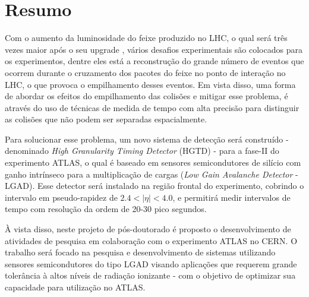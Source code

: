 \chapter*{Resumo}


Com o aumento da luminosidade do feixe produzido no LHC, o qual será três vezes maior após o seu upgrade \cite{HL_LHC,tdr}, vários desafios experimentais são colocados para os experimentos, dentre eles está a reconstrução do grande número de eventos que ocorrem durante o cruzamento dos pacotes do feixe no ponto de interação no LHC, o que provoca o empilhamento desses eventos.
Em vista disso, uma forma de abordar os efeitos do empilhamento das colisões e mitigar esse problema, é através do uso de técnicas de medida de tempo com alta precisão para distinguir as colisões que não podem ser separadas espacialmente. 

Para solucionar esse problema, um novo sistema de detecção será construído - denominado {\it High Granularity Timing Detector} (HGTD) - para a fase-II do experimento ATLAS, o qual é baseado em sensores semicondutores de silício com ganho intrínseco para a multiplicação de cargas
({\it Low Gain Avalanche Detector} - LGAD). Esse detector será instalado na região frontal do experimento, cobrindo o intervalo em pseudo-rapidez de $2.4< |\eta| <4.0$, e permitirá medir intervalos de tempo com resolução da ordem de 20-30 pico segundos.


À vista disso, neste projeto de pós-doutorado é proposto o desenvolvimento de atividades de pesquisa em colaboração com o experimento ATLAS no CERN. O trabalho será focado na pesquisa e desenvolvimento de sistemas utilizando sensores semicondutores do tipo LGAD visando aplicações que requerem grande tolerância à altos níveis de radiação ionizante \cite{JIN_LGAD,NIMA_LGAD,NIMA_LGAD_I,NIMA_LGAD_II,NIMA_LGAD_III} - com o objetivo de optimizar sua capacidade para utilização no ATLAS. %

